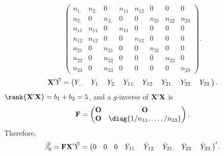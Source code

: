 \begin{Example}{}{}
\[\begin{pmatrix}
            n_{1.} & n_{2.} & 0      & n_{11} & n_{12} & 0      & 0      & 0      \\
            n_{2.} & 0      & n_{2.} & 0      & 0      & n_{21} & n_{22} & n_{23} \\
            n_{11} & n_{11} & 0      & n_{11} & 0      & 0      & 0      & 0      \\
            n_{12} & n_{12} & 0      & 0      & n_{12} & 0      & 0      & 0      \\
            n_{21} & 0      & n_{21} & 0      & 0      & n_{21} & 0      & 0      \\
            n_{22} & 0      & n_{22} & 0      & 0      & 0      & n_{22} & 0      \\
            n_{23} & 0      & n_{23} & 0      & 0      & 0      & 0      & n_{23}
        \end{pmatrix}. \]
    \[ \mathbf{X}'\vec{Y}=\begin{pmatrix}
            Y_{...} & Y_{1.} & Y_{2.} & Y_{11.} & Y_{12.} & Y_{21.} & Y_{22.} & Y_{23.}
        \end{pmatrix}. \]
    $ \rank{\Matrix{X}'\Matrix{X}}=b_1+b_2=5 $, and a $ g $-inverse of $ \mathbf{X}'\mathbf{X} $ is
    \[ \Matrix{F}=\begin{pmatrix}
            \Matrix{O} & \Matrix{O}                     \\
            \Matrix{O} & \diag{1/n_{11},\ldots,/n_{23}}
        \end{pmatrix}. \]
    Therefore,
    \[ \vec{\beta}_0'=\mathbf{F}\mathbf{X}'\vec{Y}=\begin{pmatrix}
            0 & 0 & 0 & \bar{Y}_{11.} & \bar{Y}_{12.} & \bar{Y}_{21.} & \bar{Y}_{22.} & \bar{Y}_{23.}
        \end{pmatrix}'. \]
\end{Example}
